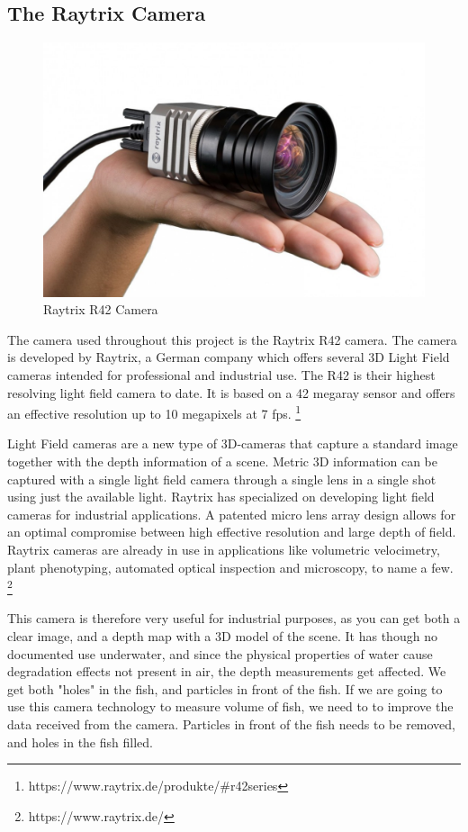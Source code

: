 \subsection{The Raytrix Camera}

\begin{figure}[h]
    \centering
    \includegraphics[width=.9\linewidth]{Images/raytrix_camera}
    \caption{Raytrix R42 Camera}
    \label{fig:raytrix_camera}
\end{figure}

The camera used throughout this project is the Raytrix R42 camera. The camera is developed by Raytrix, a German company which offers several 3D Light Field cameras intended for professional and industrial use. The R42 is their highest resolving light field camera to date. It is based on a 42 megaray sensor and offers an effective resolution up to 10 megapixels at 7 fps. \footnote{https://www.raytrix.de/produkte/#r42series}

Light Field cameras are a new type of 3D-cameras that capture a standard image together with the depth information of a scene. Metric 3D information can be captured with a single light field camera through a single lens in a single shot using just the available light. Raytrix has specialized on developing light field cameras for industrial applications. A patented micro lens array design allows for an optimal compromise between high effective resolution and large depth of field. Raytrix cameras are already in use in applications like volumetric velocimetry, plant phenotyping, automated optical inspection and microscopy, to name a few. \footnote{https://www.raytrix.de/}

This camera is therefore very useful for industrial purposes, as you can get both a clear image, and a depth map with a 3D model of the scene. It has though no documented use underwater, and since the physical properties of water cause degradation effects not present in air, the depth measurements get affected. We get both "holes" in the fish, and particles in front of the fish. If we are going to use this camera technology to measure volume of fish, we need to to improve the data received from the camera. Particles in front of the fish needs to be removed, and holes in the fish filled.

